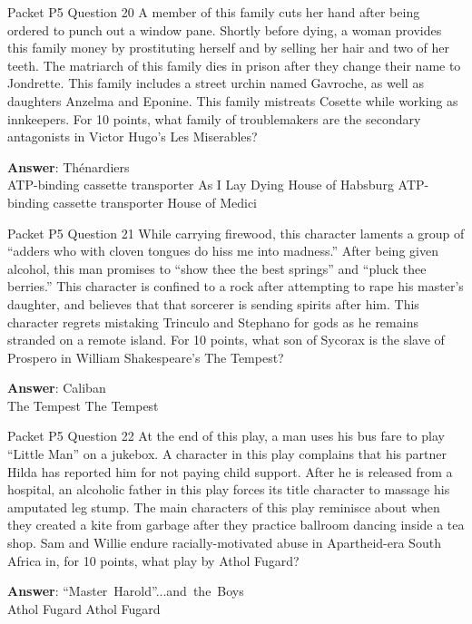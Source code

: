 \begin{frame}{Packet P5 Question 20}
A member of this family   cuts her hand after being ordered to punch out a window pane. Shortly before dying, a woman provides this family money by prostituting herself and by selling her hair and two of her teeth. The matriarch of this family dies in prison after they change their name to Jondrette. This family includes a street urchin named Gavroche, as well as daughters Anzelma and Eponine. This family mistreats Cosette while working as innkeepers. For 10 points, what family of troublemakers are the secondary antagonists in Victor Hugo’s Les Miserables?        

\textbf{Answer}: Thénardiers\\
 ATP-binding cassette transporter
 As I Lay Dying
 House of Habsburg
 ATP-binding cassette transporter
 House of Medici
\end{frame}

\begin{frame}{Packet P5 Question 21}
While carrying firewood, this character laments a group of “adders who with cloven tongues do hiss me into madness.” After being given alcohol, this man promises to “show thee the best springs” and “pluck thee berries.” This character is confined to a rock after attempting to rape his master’s daughter, and believes that that sorcerer is sending spirits after him. This character regrets mistaking Trinculo and Stephano for gods as he remains stranded on a remote island. For 10 points, what son of Sycorax is the slave     of Prospero in William     Shakespeare’s The Tempest?  

\textbf{Answer}: Caliban\\
 The Tempest
 The Tempest
\end{frame}

\begin{frame}{Packet P5 Question 22}
At the end of this play, a man uses his bus fare to play ``Little Man'' on a jukebox. A character in this   play complains that his partner Hilda has reported him for not paying child support. After he is released from a hospital, an alcoholic father in this play forces its title character to massage his amputated leg stump. The main characters of this play reminisce about when they created a kite from garbage after they practice ballroom dancing   inside a tea shop. Sam and Willie endure racially-motivated abuse in Apartheid-era   South Africa   in, for 10 points, what play by Athol Fugard?  

\textbf{Answer}: ``Master\ Harold''...and\ the\ Boys\\
 Athol Fugard
 Athol Fugard
\end{frame}

